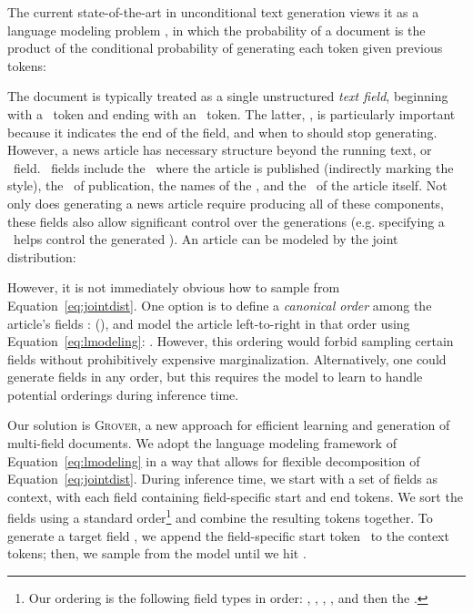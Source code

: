 \documentclass{article}
\newcommand{\modelname}{{\textsc{Grover}}}
\begin{document}
The current state-of-the-art in unconditional text generation views it as a language modeling problem \citep{bengio2003neural}, in which the probability of a document  is the product of the conditional probability of generating each token  given previous tokens:
{
\setlength{\abovedisplayskip}{1pt}
\setlength{\belowdisplayskip}{1pt}
\setlength{\abovedisplayshortskip}{0pt}
\setlength{\belowdisplayshortskip}{0pt}

}The document is typically treated as a single unstructured \emph{text field}, beginning with a \tokenstart~token and ending with an \tokenend~token. The latter, \tokenend, is particularly important because it indicates the end of the field, and when to should stop generating.
However, a news article has necessary structure beyond the running text, or \bodyfield~field. \Metadata~fields include the \domainfield~where the article is published (indirectly marking the style), the \datefield~of publication, the names of the \authorsfield, and the \headlinefield~of the article itself. Not only does generating a news article require producing all of these components, these fields also allow significant control over the generations (e.g. specifying a \headlinefield~helps control the generated \bodyfield). An article can be modeled by the joint distribution:
{
\setlength{\abovedisplayshortskip}{0pt}
\setlength{\belowdisplayshortskip}{0pt}

}However, it is not immediately obvious how to sample from Equation~\ref{eq:jointdist}. One option is to define a \emph{canonical order} among the article's fields : (), and model the article left-to-right in that order using Equation~\ref{eq:lmodeling}: . However, this ordering would forbid sampling certain fields without prohibitively expensive marginalization. Alternatively, one could generate fields in any order, but this requires the model to learn to handle  potential orderings during inference time. 

Our solution is \modelname, a new approach for efficient learning and generation of multi-field documents. We adopt the language modeling framework of Equation~\ref{eq:lmodeling} in a way that allows for flexible decomposition of Equation~\ref{eq:jointdist}. During inference time, we start with a set of fields  as context, with each field  containing field-specific start and end tokens. We sort the fields using a standard order\footnote{Our ordering is the following field types in order:  \domainfield, \datefield, \authorsfield, \headlinefield, and then the \bodyfield.} and combine the resulting tokens together. To generate a target field , we append the field-specific start token \taustart~to the context tokens; then, we sample from the model until we hit \tauend.
\end{document}
